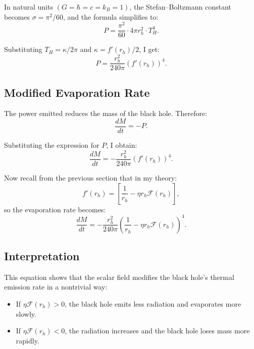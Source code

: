 \documentclass[12pt]{article}
\begin{document}
In natural units \( (G = \hbar = c = k_B = 1) \), the Stefan--Boltzmann constant becomes \( \sigma = \pi^2 / 60 \), and the formula simplifies to:
\begin{equation}
P = \frac{\pi^2}{60} \cdot 4\pi r_h^2 \cdot T_H^4.
\end{equation}

Substituting \( T_H = \kappa / 2\pi \) and \( \kappa = f'(r_h)/2 \), I get:
\begin{equation}
P = \frac{r_h^2}{240\pi} \left( f'(r_h) \right)^4.
\end{equation}

\subsection{Modified Evaporation Rate}

The power emitted reduces the mass of the black hole. Therefore:
\begin{equation}
\frac{dM}{dt} = -P.
\end{equation}

Substituting the expression for \( P \), I obtain:
\begin{equation}
\frac{dM}{dt} = -\frac{r_h^2}{240\pi} \left( f'(r_h) \right)^4.
\label{eq:mass_loss}
\end{equation}

Now recall from the previous section that in my theory:
\[
f'(r_h) = \left[ \frac{1}{r_h} - \eta r_h \mathcal{F}(r_h) \right],
\]
so the evaporation rate becomes:
\begin{equation}
\frac{dM}{dt} = -\frac{r_h^2}{240\pi} \left( \frac{1}{r_h} - \eta r_h \mathcal{F}(r_h) \right)^4.
\label{eq:modified_mass_loss}
\end{equation}

\subsection{Interpretation}

This equation shows that the scalar field modifies the black hole's thermal emission rate in a nontrivial way:
\begin{itemize}
    \item If \( \eta \mathcal{F}(r_h) > 0 \), the black hole emits less radiation and evaporates more slowly.
    \item If \( \eta \mathcal{F}(r_h) < 0 \), the radiation increases and the black hole loses mass more rapidly.
\end{itemize}
\end{document}
